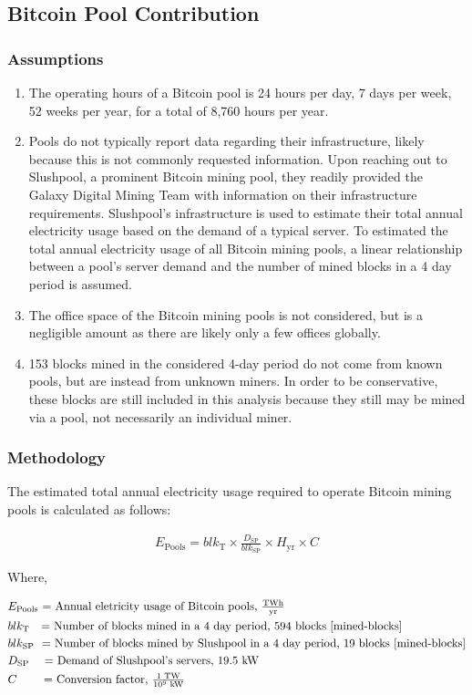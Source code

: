 \subsection{Bitcoin Pool Contribution}\label{sec:btc-pools}
\subsubsection{Assumptions}
\begin{enumerate}
  \item The operating hours of a Bitcoin pool is 24 hours per day, 7 days per week, 52 weeks per year, for a total of 8,760 hours per year.
  \item Pools do not typically report data regarding their infrastructure, likely because this is not commonly requested information.
  Upon reaching out to Slushpool, a prominent Bitcoin mining pool, they readily provided the Galaxy Digital Mining Team with information on their infrastructure requirements.
  Slushpool's infrastructure is used to estimate their total annual electricity usage based on the demand of a typical server.
  To estimated the total annual electricity usage of all Bitcoin mining pools, a linear relationship between a pool's server demand and the number of mined blocks in a 4 day period is assumed.
\item The office space of the Bitcoin mining pools is not considered, but is a negligible amount as there are likely only a few offices globally.
\item 153 blocks mined in the considered 4-day period do not come from known pools, but are instead from unknown miners.
  In order to be conservative, these blocks are still included in this analysis because they still may be mined via a pool, not necessarily an individual miner.
\end{enumerate}

\subsubsection{Methodology}
The estimated total annual electricity usage required to operate Bitcoin mining pools is calculated as follows:

\begin{align}\label{eqn:btc-pool-e}
  E_\textrm{Pools} = blk_\textrm{T} \times \frac{D_\textrm{SP}}{blk_\textrm{SP}} \times H_\textrm{yr} \times C
\end{align}

\noindent
Where,

\begin{align*}
&E_\textrm{Pools} \textrm{ = Annual eletricity usage of Bitcoin pools, $\tfrac{ \textrm{{T}Wh} } { \textrm{yr} }$} \\
&blk_\textrm{T}   \textrm{ \ \ = Number of blocks mined in a 4 day period, 594 blocks \cite{mined-blocks}} \\
&blk_\textrm{SP}  \textrm{ \ = Number of blocks mined by Slushpool in a 4 day period, 19 blocks \cite{mined-blocks}} \\
&D_\textrm{SP}    \textrm{ \quad = Demand of Slushpool's servers, 19.5 kW} \\
&C                \textrm{\qquad \ = Conversion factor, $\tfrac{1 \textrm{ TW} } { 10^9 \textrm{ kW}}$}
\end{align*}

